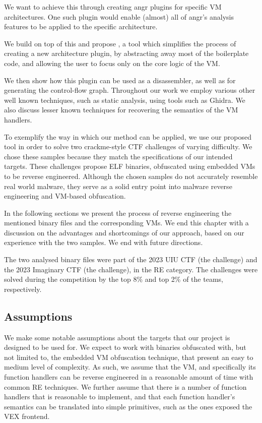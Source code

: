 We want to achieve this through creating angr plugins for specific VM architectures. One such plugin would enable (almost) all of angr's analysis features to be applied to the specific architecture. 

We build on top of this and propose , a tool which simplifies the process of creating a new architecture plugin, by abstracting away most of the boilerplate code, and allowing the user to focus only on the core logic of the \gls{VM}. 

We then show how this plugin can be used as a disassembler, as well as for generating the control-flow graph. Throughout our work we employ various other well known techniques, such as static analysis, using tools such as Ghidra. We also discuss lesser known techniques for recovering the semantics of the \gls{VM} handlers.

To exemplify the way in which our method can be applied, we use our proposed tool in order to solve two crackme-style \gls{CTF} challenges of varying difficulty. We chose these samples because they match the specifications of our intended targets. These challenges propose \gls{ELF} binaries, obfuscated using embedded \glspl{VM} to be reverse engineered. Although the chosen samples do not accurately resemble real world malware, they serve as a solid entry point into malware reverse engineering and \gls{VM}-based obfuscation.

In the following sections we present the process of reverse engineering the mentioned binary files and the corresponding \glspl{VM}. We end this chapter with a discussion on the advantages and shortcomings of our approach, based on our experience with the two samples. We end with future directions.

The two analysed binary files were part of the 2023 UIU CTF (the  challenge) \cite{uiu2023} and the 2023 Imaginary CTF \cite{ictf2023} (the  challenge), in the \gls{RE} category. The challenges were solved during the competition by the top 8\% and top 2\% of the teams, respectively.

\subsection{Assumptions}

We make some notable assumptions about the targets that our project is designed to be used for. We expect to work with binaries obfuscated with, but not limited to, the embedded \gls{VM} obfuscation technique, that present an easy to medium level of complexity. As such, we assume that the \gls{VM}, and specifically its function handlers can be reverse engineered in a reasonable amount of time with common \gls{RE} techniques. We further assume that there is a number of function handlers that is reasonable to implement, and that each function handler's semantics can be translated into simple primitives, such as the ones exposed the  VEX frontend.

